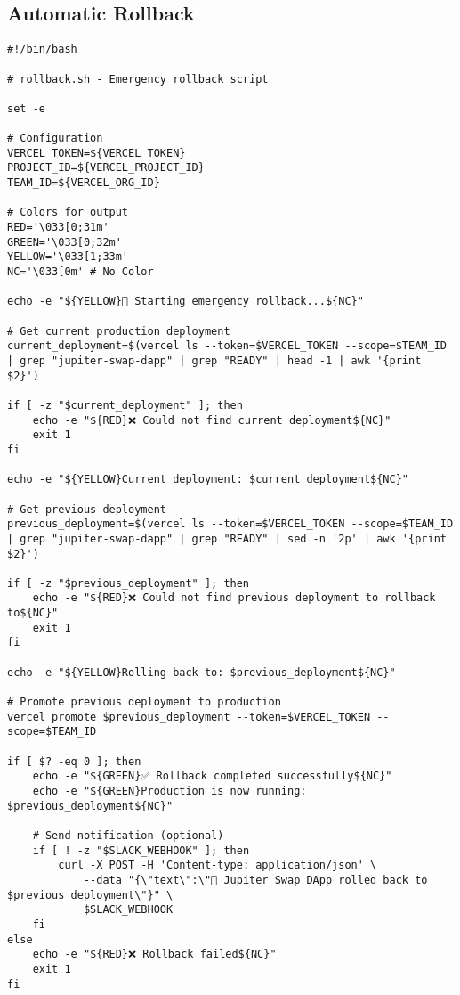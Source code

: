 \documentclass[11pt,a4paper]{article}
\begin{document}
\subsection{Automatic Rollback}

\begin{lstlisting}[style=bash, caption=Rollback Script]
#!/bin/bash

# rollback.sh - Emergency rollback script

set -e

# Configuration
VERCEL_TOKEN=${VERCEL_TOKEN}
PROJECT_ID=${VERCEL_PROJECT_ID}
TEAM_ID=${VERCEL_ORG_ID}

# Colors for output
RED='\033[0;31m'
GREEN='\033[0;32m'
YELLOW='\033[1;33m'
NC='\033[0m' # No Color

echo -e "${YELLOW}🔄 Starting emergency rollback...${NC}"

# Get current production deployment
current_deployment=$(vercel ls --token=$VERCEL_TOKEN --scope=$TEAM_ID | grep "jupiter-swap-dapp" | grep "READY" | head -1 | awk '{print $2}')

if [ -z "$current_deployment" ]; then
    echo -e "${RED}❌ Could not find current deployment${NC}"
    exit 1
fi

echo -e "${YELLOW}Current deployment: $current_deployment${NC}"

# Get previous deployment
previous_deployment=$(vercel ls --token=$VERCEL_TOKEN --scope=$TEAM_ID | grep "jupiter-swap-dapp" | grep "READY" | sed -n '2p' | awk '{print $2}')

if [ -z "$previous_deployment" ]; then
    echo -e "${RED}❌ Could not find previous deployment to rollback to${NC}"
    exit 1
fi

echo -e "${YELLOW}Rolling back to: $previous_deployment${NC}"

# Promote previous deployment to production
vercel promote $previous_deployment --token=$VERCEL_TOKEN --scope=$TEAM_ID

if [ $? -eq 0 ]; then
    echo -e "${GREEN}✅ Rollback completed successfully${NC}"
    echo -e "${GREEN}Production is now running: $previous_deployment${NC}"
    
    # Send notification (optional)
    if [ ! -z "$SLACK_WEBHOOK" ]; then
        curl -X POST -H 'Content-type: application/json' \
            --data "{\"text\":\"🔄 Jupiter Swap DApp rolled back to $previous_deployment\"}" \
            $SLACK_WEBHOOK
    fi
else
    echo -e "${RED}❌ Rollback failed${NC}"
    exit 1
fi
\end{lstlisting}
\end{document}
